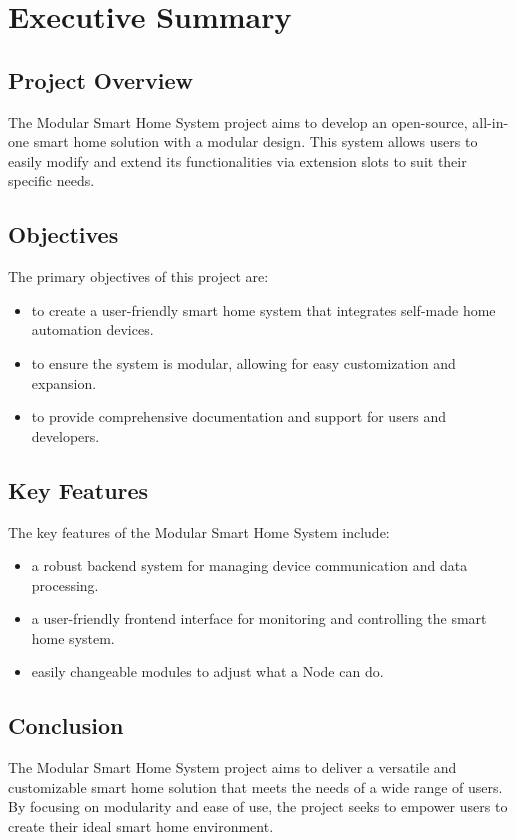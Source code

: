 \chapter{Executive Summary}

\section{Project Overview}
The Modular Smart Home System project aims to develop an open-source, 
all-in-one smart home solution with a modular design. This system 
allows users to easily modify and extend its functionalities via 
extension slots to suit their specific needs.

\section{Objectives}
The primary objectives of this project are:
\begin{itemize}
    \item to create a user-friendly smart home system that integrates self-made home automation devices.
    \item to ensure the system is modular, allowing for easy customization and expansion.
    \item to provide comprehensive documentation and support for users and developers.
\end{itemize}

\section{Key Features}
The key features of the Modular Smart Home System include:
\begin{itemize}
    \item a robust backend system for managing device communication and data processing.
    \item a user-friendly frontend interface for monitoring and controlling the smart home system.
    \item easily changeable modules to adjust what a Node can do.
\end{itemize}

\section{Conclusion}
The Modular Smart Home System project aims to deliver a versatile 
and customizable smart home solution that meets the needs of a wide 
range of users. By focusing on modularity and ease of use, the project 
seeks to empower users to create their ideal smart home environment.